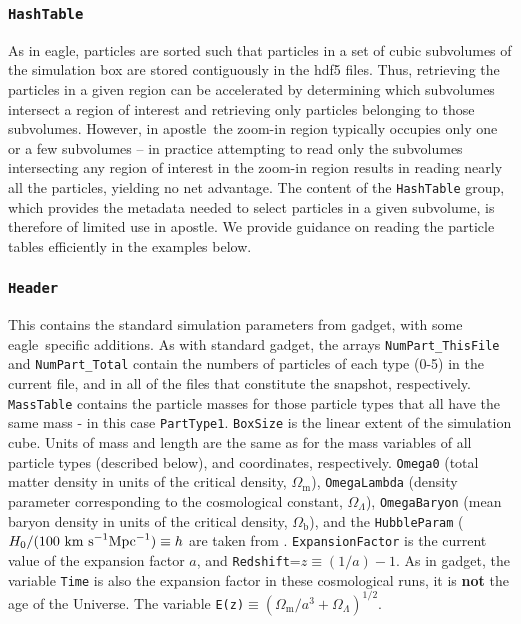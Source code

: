 \documentclass[10pt, a4paper]{article}
\newcommand{\eagle}{{\sc eagle}}
\newcommand{\apostle}{{\sc apostle}}
\newcommand{\gadget}{{\sc gadget}}
\begin{document}
\subsubsection{\texttt{HashTable}}
\label{SecHashTable}

As in \eagle, particles are sorted such that particles in a set of cubic subvolumes of the simulation box are stored contiguously in the hdf5 files. Thus, retrieving the particles in a given region can be accelerated by determining which subvolumes intersect a region of interest and retrieving only particles belonging to those subvolumes. However, in \apostle\ the zoom-in region typically occupies only one or a few subvolumes -- in practice attempting to read only the subvolumes intersecting any region of interest in the zoom-in region results in reading nearly all the particles, yielding no net advantage. The content of the \texttt{HashTable} group, which provides the metadata needed to select particles in a given subvolume, is therefore of limited use in \apostle. We provide guidance on reading the particle tables efficiently in the examples below.

\subsubsection{\texttt{Header}}
\label{SecHeader}

This contains the standard simulation parameters from \gadget, with some \eagle\ specific additions. As with standard \gadget, the arrays \texttt{NumPart\_ThisFile} and \texttt{NumPart\_Total} contain the numbers of particles of each type (0-5) in the current file, and in all of the files that constitute the snapshot, respectively. \texttt{MassTable} contains the particle masses for those particle types that all have the same mass - in this case \texttt{PartType1}. \texttt{BoxSize} is the linear extent of the simulation cube. Units of mass and length are the same as for the mass variables of all particle types (described below), and coordinates, respectively. \texttt{Omega0} (total matter density in units of the critical density, $\Omega_{\mathrm{m}}$), \texttt{OmegaLambda} (density parameter corresponding to the cosmological constant, $\Omega_\Lambda$), \texttt{OmegaBaryon} (mean baryon density in units of the critical density, $\Omega_{\mathrm{b}}$), and the \texttt{HubbleParam} ($H_0/(100~{\rm km~s}^{-1}{\rm Mpc}^{-1})\equiv h$ are taken from \cite{2011ApJS..192...18K}. \texttt{ExpansionFactor} is the current value of the expansion factor $a$, and \texttt{Redshift}=$z\equiv (1/a) - 1$. As in \gadget, the variable \texttt{Time} is also the expansion factor in these cosmological runs, it is {\bf not} the age of the Universe. The variable \texttt{E(z)}$\equiv (\Omega_{\mathrm{m}}/a^3+\Omega_\Lambda)^{1/2}$.
\end{document}
